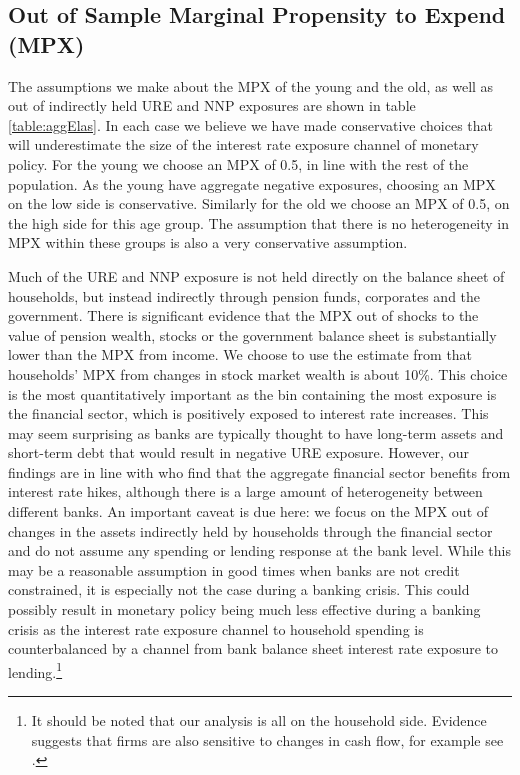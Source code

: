 \documentclass[titlepage]{\econtex}\newcommand{\texname}{ConsumptionHeterogeneity}
\begin{document}
\subsection{Out of Sample Marginal Propensity to Expend (MPX)}
The assumptions we make about the MPX of the young and the old, as well as out of indirectly held URE and NNP exposures are shown in table \ref{table:aggElas}. In each case we believe we have made conservative choices that will underestimate the size of the interest rate exposure channel of monetary policy. For the young we choose an MPX of 0.5, in line with the rest of the population. As the young have aggregate negative exposures, choosing an MPX on the low side is conservative. Similarly for the old we choose an MPX of 0.5, on the high side for this age group. The assumption that there is no heterogeneity in MPX within these groups is also a very conservative assumption.

Much of the URE and NNP exposure is not held directly on the balance sheet of households, but instead indirectly through pension funds, corporates and the government. There is significant evidence that the MPX out of shocks to the value of pension wealth, stocks or the government balance sheet is substantially lower than the MPX from income. We choose to use the estimate from \cite{maggio_stock_2018} that households' MPX from changes in stock market wealth is about 10\%. This choice is the most quantitatively important as the bin containing the most exposure is the financial sector, which is positively exposed to interest rate increases. This may seem surprising as banks are typically thought to have long-term assets and short-term debt that would result in negative URE exposure. However, our findings are in line with \cite{landier_banks_2013} who find that the aggregate financial sector benefits from interest rate hikes, although there is a large amount of heterogeneity between different banks. An important caveat is due here: we focus on the MPX out of changes in the assets indirectly held by households through the financial sector and do not assume any spending or lending response at the bank level. While this may be a reasonable assumption in good times when banks are not credit constrained, it is especially not the case during a banking crisis. This could possibly result in monetary policy being much less effective during a banking crisis as the interest rate exposure channel to household spending is counterbalanced by a channel from bank balance sheet interest rate exposure to lending.\footnote{It should be noted that our analysis is all on the household side. Evidence suggests that firms are also sensitive to changes in cash flow, for example see \cite{blanchard_what_1994}.} 
\end{document}
